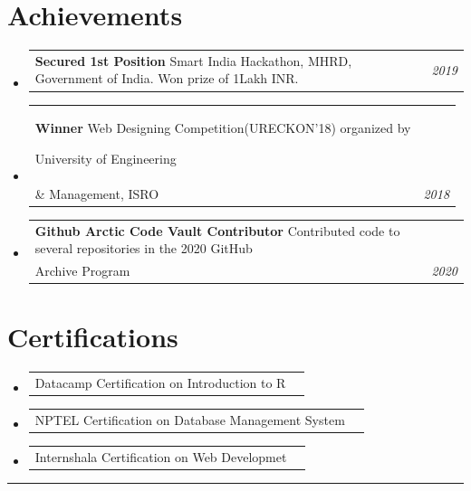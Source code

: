 \documentclass[a4paper,11pt]{article}
\makeatletter
\newcommand{\resumePOR}[3]{
\vspace{0.5mm}\item
    \begin{tabular*}{0.97\textwidth}[t]{l@{\extracolsep{\fill}}r}
        \textbf{#1}\hspace{0.3mm}#2 & \textit{\small{#3}} 
    \end{tabular*}
    \vspace{-2mm}
}
\newcommand{\resumeSubHeadingListStart}{\begin{itemize}[leftmargin=*,labelsep=0mm]}
\newcommand{\resumeSubHeadingListEnd}{\end{itemize}\vspace{2mm}}
\makeatother
\begin{document}
\section{Achievements}
\vspace{-0.4mm}
\resumeSubHeadingListStart
\resumePOR{Secured 1st Position } %
    {Smart India Hackathon, MHRD, Government of India. Won prize of 1Lakh INR. } %
    {2019} %
    
\resumePOR{Winner } %
    {Web Designing Competition(URECKON'18) organized by
    
    University of Engineering \\ \& Management, ISRO} %
    {2018} %
    
    \resumePOR{Github Arctic Code Vault Contributor } %
    {Contributed code to several repositories in the 2020 GitHub \\ Archive Program} %
    {2020} %

\resumeSubHeadingListEnd
\vspace{-4mm}

\section{Certifications}
\vspace{-0.2mm}
\resumeSubHeadingListStart
\resumePOR{}{
Datacamp Certification on Introduction to R
}{}

\resumePOR{}{
NPTEL Certification on Database Management System
}{}
\resumePOR{}{
Internshala Certification on Web Developmet
}{}
\resumeSubHeadingListEnd



\hspace*{-5mm}\rule{1.035\textwidth}{0.1mm}

\end{document}
